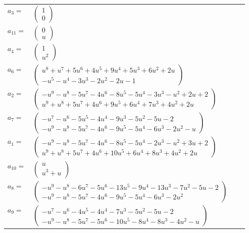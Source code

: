 \documentclass[1p]{elsarticle_modified}
\theoremstyle{definition}
\begin{document}
\begin{tabular}{m{7pt} m{180pt} m{7pt} m{180pt} }
\flushright $a_{3}=$&$\begin{pmatrix}1\\0\end{pmatrix}$ \\
\flushright $a_{11}=$&$\begin{pmatrix}0\\u\end{pmatrix}$ \\
\flushright $a_{4}=$&$\begin{pmatrix}1\\u^2\end{pmatrix}$ \\
\flushright $a_{6}=$&$\begin{pmatrix}u^8+u^7+5 u^6+4 u^5+9 u^4+5 u^3+6 u^2+2 u\\- u^5- u^4-3 u^3-2 u^2-2 u-1\end{pmatrix}$ \\
\flushright $a_{2}=$&$\begin{pmatrix}- u^9- u^8-5 u^7-4 u^6-8 u^5-5 u^4-3 u^3- u^2+2 u+2\\u^9+u^8+5 u^7+4 u^6+9 u^5+6 u^4+7 u^3+4 u^2+2 u\end{pmatrix}$ \\
\flushright $a_{7}=$&$\begin{pmatrix}- u^7- u^6-5 u^5-4 u^4-9 u^3-5 u^2-5 u-2\\- u^9- u^8-5 u^7-4 u^6-9 u^5-5 u^4-6 u^3-2 u^2- u\end{pmatrix}$ \\
\flushright $a_{1}=$&$\begin{pmatrix}- u^9- u^8-5 u^7-4 u^6-8 u^5-5 u^4-2 u^3- u^2+3 u+2\\u^9+u^8+5 u^7+4 u^6+10 u^5+6 u^4+8 u^3+4 u^2+2 u\end{pmatrix}$ \\
\flushright $a_{10}=$&$\begin{pmatrix}u\\u^3+u\end{pmatrix}$ \\
\flushright $a_{8}=$&$\begin{pmatrix}- u^9- u^8-6 u^7-5 u^6-13 u^5-9 u^4-13 u^3-7 u^2-5 u-2\\- u^9- u^8-5 u^7-4 u^6-9 u^5-5 u^4-6 u^3-2 u^2\end{pmatrix}$ \\
\flushright $a_{9}=$&$\begin{pmatrix}- u^7- u^6-4 u^5-4 u^4-7 u^3-5 u^2-5 u-2\\- u^9- u^8-5 u^7-5 u^6-10 u^5-8 u^4-8 u^3-4 u^2- u\end{pmatrix}$ \\

\end{tabular}
\end{document}
